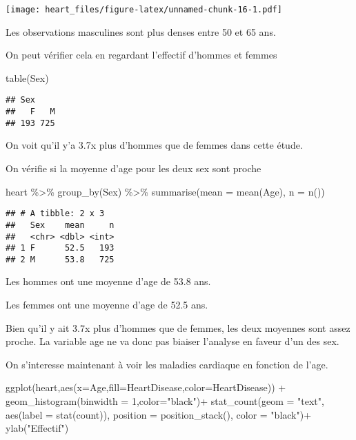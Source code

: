 \documentclass[
]{article}
\newenvironment{Shaded}{\begin{snugshade}}{\end{snugshade}}
\newcommand{\AttributeTok}[1]{\textcolor[rgb]{0.77,0.63,0.00}{#1}}
\newcommand{\DecValTok}[1]{\textcolor[rgb]{0.00,0.00,0.81}{#1}}
\newcommand{\FunctionTok}[1]{\textcolor[rgb]{0.00,0.00,0.00}{#1}}
\newcommand{\NormalTok}[1]{#1}
\newcommand{\SpecialCharTok}[1]{\textcolor[rgb]{0.00,0.00,0.00}{#1}}
\newcommand{\StringTok}[1]{\textcolor[rgb]{0.31,0.60,0.02}{#1}}
\begin{document}
\texttt{[image: heart\_files/figure-latex/unnamed-chunk-16-1.pdf]}

Les observations masculines sont plus denses entre 50 et 65 ans.

On peut vérifier cela en regardant l'effectif d'hommes et femmes

\begin{Shaded}
\begin{Highlighting}[]
\FunctionTok{table}\NormalTok{(Sex)}
\end{Highlighting}
\end{Shaded}

\begin{verbatim}
## Sex
##   F   M 
## 193 725
\end{verbatim}

On voit qu'il y'a 3.7x plus d'hommes que de femmes dans cette étude.

On vérifie si la moyenne d'age pour les deux sex sont proche

\begin{Shaded}
\begin{Highlighting}[]
\NormalTok{heart }\SpecialCharTok{\%\textgreater{}\%}
  \FunctionTok{group\_by}\NormalTok{(Sex) }\SpecialCharTok{\%\textgreater{}\%}
  \FunctionTok{summarise}\NormalTok{(}\AttributeTok{mean =} \FunctionTok{mean}\NormalTok{(Age), }\AttributeTok{n =} \FunctionTok{n}\NormalTok{())}
\end{Highlighting}
\end{Shaded}

\begin{verbatim}
## # A tibble: 2 x 3
##   Sex    mean     n
##   <chr> <dbl> <int>
## 1 F      52.5   193
## 2 M      53.8   725
\end{verbatim}

Les hommes ont une moyenne d'age de 53.8 ans.

Les femmes ont une moyenne d'age de 52.5 ans.

Bien qu'il y ait 3.7x plus d'hommes que de femmes, les deux moyennes
sont assez proche. La variable age ne va donc pas biaiser l'analyse en
faveur d'un des sex.

On s'interesse maintenant à voir les maladies cardiaque en fonction de
l'age.

\begin{Shaded}
\begin{Highlighting}[]
\FunctionTok{ggplot}\NormalTok{(heart,}\FunctionTok{aes}\NormalTok{(}\AttributeTok{x=}\NormalTok{Age,}\AttributeTok{fill=}\NormalTok{HeartDisease,}\AttributeTok{color=}\NormalTok{HeartDisease)) }\SpecialCharTok{+}
\FunctionTok{geom\_histogram}\NormalTok{(}\AttributeTok{binwidth =} \DecValTok{1}\NormalTok{,}\AttributeTok{color=}\StringTok{"black"}\NormalTok{)}\SpecialCharTok{+}
\FunctionTok{stat\_count}\NormalTok{(}\AttributeTok{geom =} \StringTok{"text"}\NormalTok{, }\FunctionTok{aes}\NormalTok{(}\AttributeTok{label =} \FunctionTok{stat}\NormalTok{(count)), }
             \AttributeTok{position =} \FunctionTok{position\_stack}\NormalTok{(), }\AttributeTok{color =} \StringTok{"black"}\NormalTok{)}\SpecialCharTok{+}
\FunctionTok{ylab}\NormalTok{(}\StringTok{"Effectif"}\NormalTok{)}
\end{Highlighting}
\end{Shaded}
\end{document}
